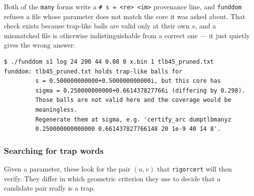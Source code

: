 \documentclass{amsart}
\begin{document}
Both of the \texttt{many} forms write a \verb|# s = <re> <im>| provenance line, and
\texttt{funddom} refuses a file whose parameter does not match the core it was asked about.  That
check exists because trap-like balls are valid only at their own $s$, and a mismatched file is
otherwise indistinguishable from a correct one --- it just quietly gives the wrong answer:
\begin{verbatim}
$ ./funddom s1 log 24 200 44 0.08 0 x.bin 1 tlb45_pruned.txt
funddom: tlb45_pruned.txt holds trap-like balls for
         s = 0.500000000000+0.500000000000i, but this core has
         sigma = 0.250000000000+0.661437827766i (differing by 0.298).
         Those balls are not valid here and the coverage would be
         meaningless.
         Regenerate them at sigma, e.g. 'certify_arc dumptlbmanyz
         0.250000000000000 0.661437827766148 20 1e-9 40 14 8'.
\end{verbatim}

\subsubsection{Searching for trap words}

Given a parameter, these look for the pair $(u,v)$ that \texttt{rigorcert} will then verify.
They differ in which geometric criterion they use to decide that a candidate pair really is a
trap.
\end{document}
